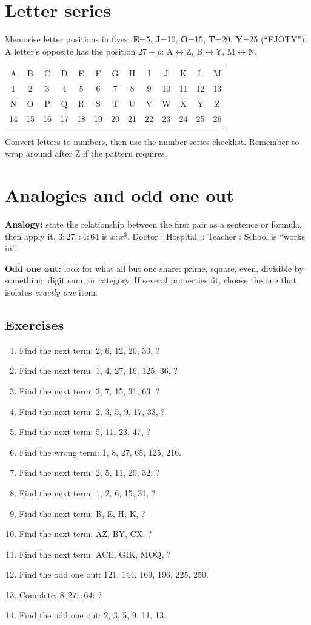 \documentclass[11pt,a4paper,openany]{report}
\newenvironment{exercises}{\subsection*{Exercises \thechapter}\begin{enumerate}[label=\textbf{\thechapter.\arabic*},leftmargin=3.2em]}{\end{enumerate}}
\begin{document}
\section{Letter series}
Memorise letter positions in fives: \textbf{E}=5, \textbf{J}=10, \textbf{O}=15, \textbf{T}=20, \textbf{Y}=25 (``EJOTY''). A letter's opposite has the position $27-p$: A$\leftrightarrow$Z, B$\leftrightarrow$Y, M$\leftrightarrow$N.
\begin{center}\small
\begin{tabular}{ccccccccccccc}
A&B&C&D&E&F&G&H&I&J&K&L&M\\
1&2&3&4&5&6&7&8&9&10&11&12&13\\\hline
N&O&P&Q&R&S&T&U&V&W&X&Y&Z\\
14&15&16&17&18&19&20&21&22&23&24&25&26
\end{tabular}
\end{center}
Convert letters to numbers, then use the number-series checklist. Remember to wrap around after Z if the pattern requires.

\section{Analogies and odd one out}
\textbf{Analogy:} state the relationship between the first pair as a sentence or formula, then apply it. $3:27::4:64$ is $x:x^3$. Doctor : Hospital :: Teacher : School is ``works in''.

\textbf{Odd one out:} look for what all but one share: prime, square, even, divisible by something, digit sum, or category. If several properties fit, choose the one that isolates \emph{exactly one} item.

\begin{exercises}
\item Find the next term: 2, 6, 12, 20, 30, ?
\item Find the next term: 1, 4, 27, 16, 125, 36, ?
\item Find the next term: 3, 7, 15, 31, 63, ?
\item Find the next term: 2, 3, 5, 9, 17, 33, ?
\item Find the next term: 5, 11, 23, 47, ?
\item Find the wrong term: 1, 8, 27, 65, 125, 216.
\item Find the next term: 2, 5, 11, 20, 32, ?
\item Find the next term: 1, 2, 6, 15, 31, ?
\item Find the next term: B, E, H, K, ?
\item Find the next term: AZ, BY, CX, ?
\item Find the next term: ACE, GIK, MOQ, ?
\item Find the odd one out: 121, 144, 169, 196, 225, 250.
\item Complete: $8:27::64:\ ?$
\item Find the odd one out: 2, 3, 5, 9, 11, 13.
\end{exercises}
\end{document}
